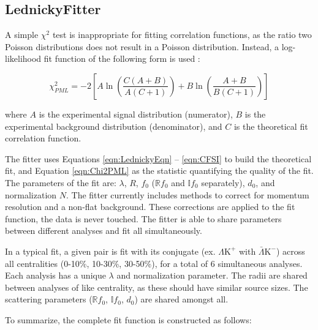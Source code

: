 \documentclass[ALICE,manyauthors]{cernphprep}
\newcommand{\LamKchP}{$\Lambda\mathrm{K^{+}}$\xspace}
\newcommand{\ALamKchM}{$\bar{\Lambda}\mathrm{K^{-}}$\xspace}
\begin{document}
\subsection{LednickyFitter}
\label{LednickyFitter}


A simple $\chi^{2}$ test is inappropriate for fitting correlation functions, as the ratio two Poisson distributions does not result in a Poisson distribution.
Instead, a log-likelihood fit function of the following form is used \cite{Lisa:2005dd}:

\begin{equation}
 \chi^{2}_{PML} = -2\left[A\ln\left(\frac{C(A+B)}{A(C+1)}\right) + B\ln\left(\frac{A+B}{B(C+1)}\right)\right]
\label{eqn:Chi2PML}
\end{equation}

where $A$ is the experimental signal distribution (numerator), $B$ is the experimental background distribution (denominator), and $C$ is the theoretical fit correlation function.

The fitter uses Equations \ref{eqn:LednickyEqn} -- \ref{eqn:CFSI} to build the theoretical fit, and Equation \ref{eqn:Chi2PML} as the statistic quantifying the quality of the fit.
The parameters of the fit are: $\lambda$, $R$, $f_{0}$ ($\mathbb{R}f_{0}$ and $\mathbb{I}f_{0}$ separately), $d_{0}$, and normalization $N$.
The fitter currently includes methods to correct for momentum resolution and a non-flat background.
These corrections are applied to the fit function, the data is never touched.
The fitter is able to share parameters between different analyses and fit all simultaneously.  

In a typical fit, a given pair is fit with its conjugate (ex. \LamKchP with \ALamKchM) across all centralities (0-10\%, 10-30\%, 30-50\%), for a total of 6 simultaneous analyses.
Each analysis has a unique $\lambda$ and normalization parameter.
The radii are shared between analyses of like centrality, as these should have similar source sizes.
The scattering parameters ($\mathbb{R}f_{0}$, $\mathbb{I}f_{0}$, $d_{0}$) are shared amongst all.

To summarize, the complete fit function is constructed as follows:
\end{document}
